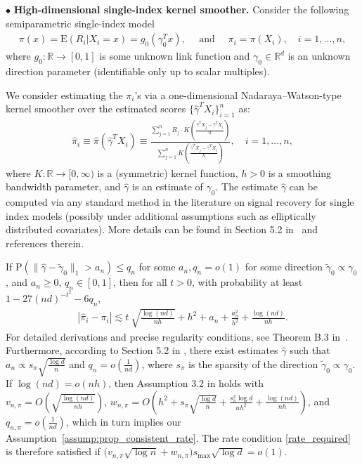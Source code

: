 \documentclass[ejsv2,noshowframe]{imsart}
\theoremstyle{plain}
\theoremstyle{definition}
\theoremstyle{remark}
\renewcommand{\hat}{\widehat}
\renewcommand{\tilde}{\widetilde}
\begin{document}
$\bullet$  \textbf{High-dimensional single-index kernel smoother.} Consider the following semiparametric single-index model
\begin{align*}
	\pi(x) = \mathrm{E}(R_i|X_i = x) =  g_0(\gamma_0^Tx), \quad \text{ and } \quad \pi_i=\pi(X_i), \quad i = 1, \ldots, n,  
\end{align*}  
where $g_0:\mathbb{R} \rightarrow [0,1]$ is some unknown link function and $\gamma_0 \in \mathbb{R}^d$ is an unknown direction parameter (identifiable only up to scalar multiples).

We consider estimating the $\pi_i$'s via a one-dimensional Nadaraya--Watson-type kernel smoother over the estimated scores $\{\hat{\gamma}^TX_i\}_{i=1}^n$ as:
\begin{align*}
	\hat{\pi}_i \equiv \hat{\pi}(\hat{\gamma}^TX_i) \equiv \frac{\sum_{j =1}^n R_j\cdot K\left(\frac{\hat{\gamma}^TX_j - \hat{\gamma}^TX_i}{h} \right)}{\sum_{j=1}^n K\left(\frac{\hat{\gamma}^TX_j - \hat{\gamma}^TX_i}{h} \right)}, \quad i=1, \ldots, n,
\end{align*}
where $K : \mathbb{R} \rightarrow [0,\infty)$ is a (symmetric) kernel function, $h > 0$ is a smoothing bandwidth parameter, and $\hat{\gamma}$ is an estimate of $\gamma_0$. The estimate $\hat{\gamma}$ can be computed via any standard method in the literature on signal recovery for single index models (possibly under additional assumptions such as elliptically distributed covariates). More details can be found in Section 5.2 in~\cite{chakrabortty2019high} and references therein.

If $\mathrm{P} \left(\|\hat{\gamma} - \tilde{\gamma}_0\|_1 > a_n \right) \leq q_n$ for some $a_n, q_n= o(1)$ for some direction $\tilde{\gamma}_0 \propto \gamma_0$, and $a_n \geq 0$, $q_n \in [0,1]$, then for all $t > 0$, with probability at least $1 - 27 (nd)^{-t^2} - 6 q_n$,
\begin{align*}
	\left|\hat{\pi}_i - \pi_i \right| \lesssim t \: \sqrt{\frac{\log(nd)}{nh}} +  h^2 + a_n + \frac{a_n^2}{h^2} + \frac{\log(nd)}{nh}.
\end{align*}
For detailed derivations and precise regularity conditions, see Theorem B.3 in~\cite{chakrabortty2019high}.
Furthermore, according to Section 5.2 in \cite{chakrabortty2019high}, there exist estimates $\hat{\gamma}$ such that $a_n \propto s_\pi \sqrt{\frac{\log d}{n}} $ and $q_n = o\left(\frac{1}{n d}\right)$, where $s_\pi$ is the sparsity of the direction $\tilde{\gamma}_0 \propto \gamma_0$. If $\log(nd) = o(nh)$, then Assumption 3.2 in \cite{chakrabortty2019high} holds with $v_{n,\pi} = O\left(\sqrt{\frac{\log(nd)}{nh}}\right)$, $w_{n, \pi} = O\left(h^2 + s_\pi \sqrt{\frac{\log d}{n}} + \frac{s_\pi^2\log d}{nh^2} + \frac{\log(nd)}{nh}\right)$, and $q_{n, \pi} = o\left(\frac{1}{nd}\right)$, which in turn implies our Assumption~\ref{assump:prop_consistent_rate}.   
The rate condition \eqref{rate_required} is therefore satisfied if $\big(v_{n,\pi} \sqrt{\log n} + w_{n,\pi} \big) s_{\max} \sqrt{\log d} = o(1)$. 
\end{document}
